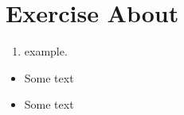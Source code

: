 





\section[\texorpdfstring{Exercise About BibTeX}{Exercise About \BibTeX{}}]{Exercise About \BibTeX{}}

\setlength\itemsep{-0.5em} %
\itemsep{-0.5em} %

\begin{enumerate}[topsep=-0.1em,itemsep=-0.3em]
    \item example.
\end{enumerate}

\begin{itemize}[topsep=8pt,itemsep=4pt,partopsep=4pt, parsep=4pt] %
    \item Some text
    \item Some text
\end{itemize}

